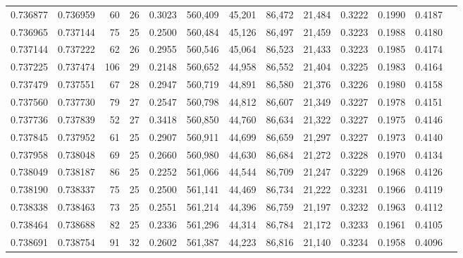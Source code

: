 \begin{tabular}{rrrrrrrrrrrrr}
0.736877 & 0.736959 &    60 &  26 &                                     0.3023 & 560,409 &  45,201 &  86,472 &  21,484 & 0.3222 & 0.1990 & 0.4187 \\
0.736965 & 0.737144 &    75 &  25 &                                     0.2500 & 560,484 &  45,126 &  86,497 &  21,459 & 0.3223 & 0.1988 & 0.4180 \\
0.737144 & 0.737222 &    62 &  26 &                                     0.2955 & 560,546 &  45,064 &  86,523 &  21,433 & 0.3223 & 0.1985 & 0.4174 \\
0.737225 & 0.737474 &   106 &  29 &                                     0.2148 & 560,652 &  44,958 &  86,552 &  21,404 & 0.3225 & 0.1983 & 0.4164 \\
0.737479 & 0.737551 &    67 &  28 &                                     0.2947 & 560,719 &  44,891 &  86,580 &  21,376 & 0.3226 & 0.1980 & 0.4158 \\
0.737560 & 0.737730 &    79 &  27 &                                     0.2547 & 560,798 &  44,812 &  86,607 &  21,349 & 0.3227 & 0.1978 & 0.4151 \\
0.737736 & 0.737839 &    52 &  27 &                                     0.3418 & 560,850 &  44,760 &  86,634 &  21,322 & 0.3227 & 0.1975 & 0.4146 \\
0.737845 & 0.737952 &    61 &  25 &                                     0.2907 & 560,911 &  44,699 &  86,659 &  21,297 & 0.3227 & 0.1973 & 0.4140 \\
0.737958 & 0.738048 &    69 &  25 &                                     0.2660 & 560,980 &  44,630 &  86,684 &  21,272 & 0.3228 & 0.1970 & 0.4134 \\
0.738049 & 0.738187 &    86 &  25 &                                     0.2252 & 561,066 &  44,544 &  86,709 &  21,247 & 0.3229 & 0.1968 & 0.4126 \\
0.738190 & 0.738337 &    75 &  25 &                                     0.2500 & 561,141 &  44,469 &  86,734 &  21,222 & 0.3231 & 0.1966 & 0.4119 \\
0.738338 & 0.738463 &    73 &  25 &                                     0.2551 & 561,214 &  44,396 &  86,759 &  21,197 & 0.3232 & 0.1963 & 0.4112 \\
0.738464 & 0.738688 &    82 &  25 &                                     0.2336 & 561,296 &  44,314 &  86,784 &  21,172 & 0.3233 & 0.1961 & 0.4105 \\
0.738691 & 0.738754 &    91 &  32 &                                     0.2602 & 561,387 &  44,223 &  86,816 &  21,140 & 0.3234 & 0.1958 & 0.4096 \\

\end{tabular}
